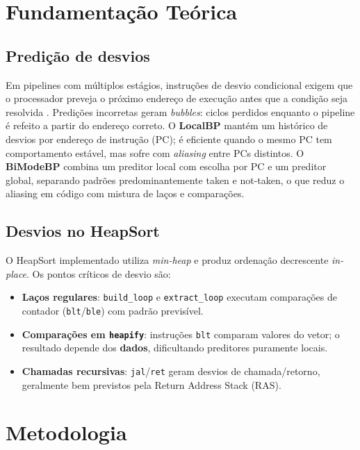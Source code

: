 \documentclass[12pt]{article}
\begin{document}
\section{Fundamentação Teórica}

\subsection{Predição de desvios}

Em pipelines com múltiplos estágios, instruções de desvio condicional exigem que o processador preveja o próximo endereço de execução antes que a condição seja resolvida \cite{hennessy2017computer}. Predições incorretas geram \emph{bubbles}: ciclos perdidos enquanto o pipeline é refeito a partir do endereço correto. O \textbf{LocalBP} mantém um histórico de desvios por endereço de instrução (PC); é eficiente quando o mesmo PC tem comportamento estável, mas sofre com \emph{aliasing} entre PCs distintos. O \textbf{BiModeBP} combina um preditor local com escolha por PC e um preditor global, separando padrões predominantemente taken e not-taken, o que reduz o aliasing em código com mistura de laços e comparações.

\subsection{Desvios no HeapSort}

O HeapSort implementado utiliza \emph{min-heap} e produz ordenação decrescente \emph{in-place}. Os pontos críticos de desvio são:

\begin{itemize}
  \item \textbf{Laços regulares}: \texttt{build\_loop} e
        \texttt{extract\_loop} executam comparações de contador
        (\texttt{blt}/\texttt{ble}) com padrão previsível.
  \item \textbf{Comparações em \texttt{heapify}}: instruções
        \texttt{blt} comparam valores do vetor; o resultado depende dos
        \textbf{dados}, dificultando preditores puramente locais.
  \item \textbf{Chamadas recursivas}: \texttt{jal}/\texttt{ret} geram
        desvios de chamada/retorno, geralmente bem previstos pela Return
        Address Stack (RAS).
\end{itemize}

\section{Metodologia}
\end{document}
